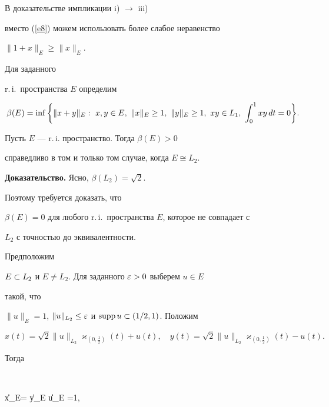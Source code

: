 В доказательстве импликации i) $\to$ iii) 


вместо (\ref{e8}) можем использовать более слабое неравенство


$\|1 + x\|_E \ge \|x\|_E$.





Для заданного 


r.\,i.\ пространства $E$ определим


$$


\beta(E) = \inf \bigg\{ \|x+y\|_E: \ x,y \in E, \ \|x\|_E \ge 1, \ \|y\|_E


\ge 1, \ xy \in L_1, \ \intl{0}{1}xy \, dt =0\bigg\}.


$$





\begin{thm}\label{t2}


Пусть $E$ --- r.\,i. пространство. Тогда $\beta (E) >0$ 


справедливо в том и только том случае, когда $E\cong L_2$.


\end{thm}





{\bf Доказательство.} Ясно, $\beta (L_2) = \sqrt 2$. 


Поэтому требуется доказать, что 


$\beta (E) =0$ для любого r.\,i.\ пространства $E$, которое не совпадает с


$L_2$ с точностью до эквивалентности.





Предположим


$E \subset L_2$ и $E \ne L_2$. Для заданного $\varepsilon >0$ выберем $u\in E$ 


такой, что


$\|u\|_E =1$, $\|u\|_{L_2} \le \varepsilon$ и $\operatorname{supp} u \subset (1/2, 1)$. Положим


$$


x(t) = \sqrt 2 \|u\|_{L_2}


\varkappa_{(0, \frac 1 2)} (t) + u(t), \quad


y(t) = \sqrt 2 \|u\|_{L_2} \varkappa_{(0, \frac 1 2)} (t) - u(t).


$$


Тогда 


$$


\|x\|_E= \|y\|_E \ge \|u\|_E =1,\quad



